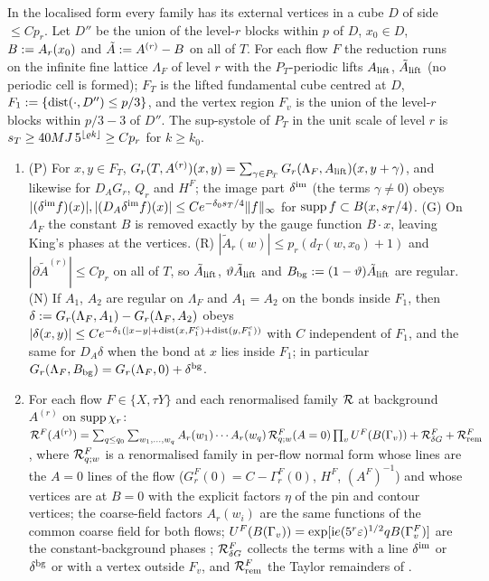 \begin{lemma}\label{rot:lem:CB}
In the localised form \cite[(3.55)]{K1} every family has its external vertices in a cube $D$ of side $\le Cp_r$. Let $D''$ be the union of the level-$r$ blocks within $p$ of $D$, $x_0\in D$, $B:= A_r(x_0)$ and $\tilde A:= A^{(r)}-B$ on all of $T$. For each flow $F$ the reduction runs on the infinite fine lattice $\Lambda_F$ of level $r$ with the $P_T$-periodic lifts $A_{\rm lift}$, $\tilde A_{\rm lift}$ (no periodic cell is formed); $F_T$ is the lifted fundamental cube centred at $D$, $F_1:=\{\operatorname{dist}(\cdot,D'')\le p/3\}$, and the vertex region $F_v$ is the union of the level-$r$ blocks within $p/3-3$ of $D''$. The sup-systole of $P_T$ in the unit scale of level $r$ is $s_T\ge40MJ\,5^{\lfloor\varrho k\rfloor}\ge Cp_r$ for $k\ge k_0$.
\begin{enumerate}[label=\textup{(\arabic*)},leftmargin=*]
\item[(0)] \textup{(P)} For $x,y\in F_T$, $G_r(T,A^{(r)})(x,y)=\sum_{\gamma\in P_T}G_r(\Lambda_F,A_{\rm lift})(x,y+\gamma)$, and likewise for $D_AG_r$, $Q_r$ and $H^F$; the image part $\delta^{\rm im}$ (the terms $\gamma\ne0$) obeys $|(\delta^{\rm im}f)(x)|,|(D_A\delta^{\rm im}f)(x)|\le Ce^{-\delta_0s_T/4}\|f\|_\infty$ for $\operatorname{supp} f\subset B(x,s_T/4)$. \textup{(G)} On $\Lambda_F$ the constant $B$ is removed exactly by the gauge function $B\cdot x$, leaving King's phases \cite[(3.46)]{K1} at the vertices. \textup{(R)} $|\tilde A_r(w)|\le p_r(d_T(w,x_0)+1)$ and $|\partial\tilde A^{(r)}|\le Cp_r$ on all of $T$, so $\tilde A_{\rm lift}$, $\vartheta\tilde A_{\rm lift}$ and $B_{\rm bg}:=(1-\vartheta)\tilde A_{\rm lift}$ are regular. \textup{(N)} If $A_1$, $A_2$ are regular on $\Lambda_F$ and $A_1=A_2$ on the bonds inside $F_1$, then $\delta:= G_r(\Lambda_F,A_1)-G_r(\Lambda_F,A_2)$ obeys $|\delta(x,y)|\le Ce^{-\delta_1(|x-y|+\operatorname{dist}(x,F_1^c)+\operatorname{dist}(y,F_1^c))}$ with $C$ independent of $F_1$, and the same for $D_A\delta$ when the bond at $x$ lies inside $F_1$; in particular $G_r(\Lambda_F,B_{\rm bg})=G_r(\Lambda_F,0)+\delta^{\rm bg}$.
\item For each flow $F\in\{X,\tau Y\}$ and each renormalised family $\mathcal R$ at background $A^{(r)}$ on $\operatorname{supp}\chi_r$: $\mathcal R^F(A^{(r)})=\sum_{q\le q_0}\sum_{w_1,\dots,w_q}A_r(w_1)\cdots A_r(w_q)\,\mathcal R^F_{q;w}(A=0)\prod_vU^F(B(\Gamma_v))+\mathcal R^F_{\delta G}+\mathcal R^F_{\rm rem}$, where $\mathcal R^F_{q;w}$ is a renormalised family in per-flow normal form whose lines are the $A=0$ lines of the flow ($G^F_r(0)=C-\Gamma^F_r(0)$, $H^F$, $(A^F)^{-1}$) and whose vertices are \cite[(3.18)--(3.26)]{K1} at $B=0$ with the explicit factors $\eta$ of the pin and contour vertices; the coarse-field factors $A_r(w_i)$ are the same functions of the common coarse field for both flows; $U^F(B(\Gamma_v))=\exp[\mathrm ie(5^r\varepsilon)^{1/2}qB(\Gamma^F_v)]$ are the constant-background phases \cite[(3.46)]{K1}; $\mathcal R^F_{\delta G}$ collects the terms with a line $\delta^{\rm im}$ or $\delta^{\rm bg}$ or with a vertex outside $F_v$, and $\mathcal R^F_{\rm rem}$ the Taylor remainders of \cite[(3.48), (3.52)]{K1}.

\end{enumerate}
\end{lemma}
